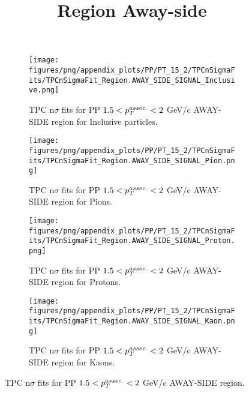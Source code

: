            \begin{figure}[H]
                \title{Region Away-side}
                \begin{subfigure}[b]{0.5\textwidth}
                    \centering
                    \texttt{[image: figures/png/appendix\_plots/PP/PT\_15\_2/TPCnSigmaFits/TPCnSigmaFit\_Region.AWAY\_SIDE\_SIGNAL\_Inclusive.png]}
                    \caption{TPC n$\sigma$ fits for PP $1.5 < \pTassoc < 2$ GeV/c AWAY-SIDE region for Inclusive particles.}
                    \label{fig:appendix_PP_$1.5 < \pTassoc < 2$ GeV/c_AWAY_SIDE_SIGNAL_Inclusive}
                \end{subfigure}
                \begin{subfigure}[b]{0.5\textwidth}
                    \centering
                    \texttt{[image: figures/png/appendix\_plots/PP/PT\_15\_2/TPCnSigmaFits/TPCnSigmaFit\_Region.AWAY\_SIDE\_SIGNAL\_Pion.png]}
                    \caption{TPC n$\sigma$ fits for PP $1.5 < \pTassoc < 2$ GeV/c AWAY-SIDE region for Pions.}
                    \label{fig:appendix_PP_$1.5 < \pTassoc < 2$ GeV/c_AWAY_SIDE_SIGNAL_Pion}
                \end{subfigure}
                \begin{subfigure}[b]{0.5\textwidth}
                    \centering
                    \texttt{[image: figures/png/appendix\_plots/PP/PT\_15\_2/TPCnSigmaFits/TPCnSigmaFit\_Region.AWAY\_SIDE\_SIGNAL\_Proton.png]}
                    \caption{TPC n$\sigma$ fits for PP $1.5 < \pTassoc < 2$ GeV/c AWAY-SIDE region for Protons.}
                    \label{fig:appendix_PP_$1.5 < \pTassoc < 2$ GeV/c_AWAY_SIDE_SIGNAL_Proton}
                \end{subfigure}
                \begin{subfigure}[b]{0.5\textwidth}
                    \centering
                    \texttt{[image: figures/png/appendix\_plots/PP/PT\_15\_2/TPCnSigmaFits/TPCnSigmaFit\_Region.AWAY\_SIDE\_SIGNAL\_Kaon.png]}
                    \caption{TPC n$\sigma$ fits for PP $1.5 < \pTassoc < 2$ GeV/c AWAY-SIDE region for Kaons.}
                    \label{fig:appendix_PP_$1.5 < \pTassoc < 2$ GeV/c_AWAY_SIDE_SIGNAL_Kaon}
                \end{subfigure}
                \caption{TPC n$\sigma$ fits for PP $1.5 < \pTassoc < 2$ GeV/c AWAY-SIDE region.}
                \label{fig:appendix_PP_$1.5 < \pTassoc < 2$ GeV/c_AWAY_SIDE_SIGNAL}
            \end{figure}
